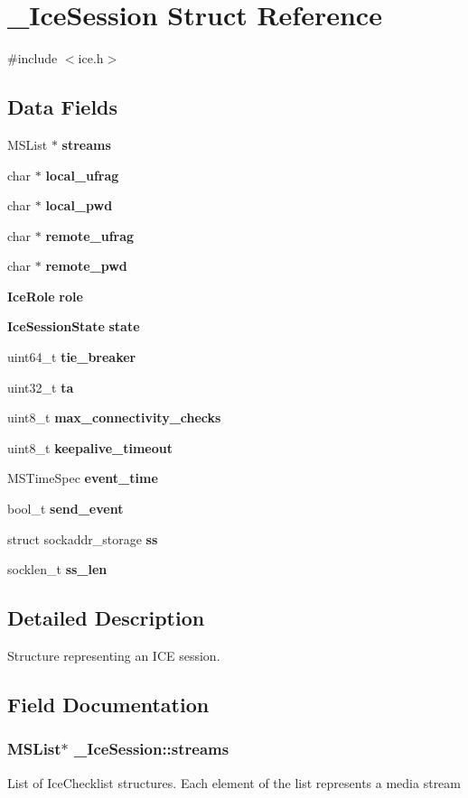 \section{\_\-IceSession Struct Reference}
\label{struct__IceSession}


{\ttfamily \#include $<$ice.h$>$}\subsection*{Data Fields}
\begin{DoxyCompactItemize}
\item 
MSList $\ast$ {\bf streams}
\item 
char $\ast$ {\bf local\_\-ufrag}
\item 
char $\ast$ {\bf local\_\-pwd}
\item 
char $\ast$ {\bf remote\_\-ufrag}
\item 
char $\ast$ {\bf remote\_\-pwd}
\item 
{\bf IceRole} {\bf role}
\item 
{\bf IceSessionState} {\bf state}
\item 
uint64\_\-t {\bf tie\_\-breaker}
\item 
uint32\_\-t {\bf ta}
\item 
uint8\_\-t {\bf max\_\-connectivity\_\-checks}
\item 
uint8\_\-t {\bf keepalive\_\-timeout}
\item 
MSTimeSpec {\bf event\_\-time}
\item 
bool\_\-t {\bf send\_\-event}
\item 
struct sockaddr\_\-storage {\bf ss}
\item 
socklen\_\-t {\bf ss\_\-len}
\end{DoxyCompactItemize}


\subsection{Detailed Description}
Structure representing an ICE session. 

\subsection{Field Documentation}
\subsubsection[{streams}]{\setlength{\rightskip}{0pt plus 5cm}MSList$\ast$ {\bf \_\-IceSession::streams}}\label{struct__IceSession_ab05c8d1301b5d38bb4bc09d9a12a5369}
List of IceChecklist structures. Each element of the list represents a media stream 
